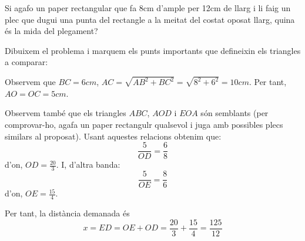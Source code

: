 \Exercise

Si agafo un paper rectangular que fa 8cm d'ample per 12cm de llarg i li faig un plec que dugui una punta del rectangle a la meitat del costat oposat llarg, quina és la mida del plegament?

\Answer

Dibuixem el problema i marquem els punts importants que defineixin els triangles a comparar:
\begin{center}
\end{center}

Observem que $BC=6cm$, $AC=\sqrt{AB^2+BC^2}=\sqrt{8^2+6^2}=10cm$. Per tant, $AO=OC=5cm$.

Observem també que els triangles $ABC$, $AOD$ i $EOA$ són semblants (per comprovar-ho, agafa un paper rectangulr qualsevol i juga amb possibles plecs similars al proposat). Usant aquestes relacions obtenim que:
\[
  \frac{5}{OD}=\frac{6}{8}  
\]
d'on, $OD=\frac{20}{3}$. I, d'altra banda:
\[
  \frac{5}{OE}=\frac{8}{6}  
\]
d'on, $OE=\frac{15}{4}$.

Per tant, la distància demanada és
\[
  x=ED=OE+OD=\frac{20}{3}+\frac{15}{4}=\frac{125}{12}  
\]